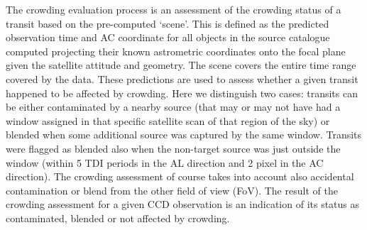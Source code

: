\documentclass{aa}
\begin{document}
The crowding evaluation process is an assessment of the crowding status of a transit based on the pre-computed `scene'. This is defined as the predicted observation time and AC coordinate for all objects in the source catalogue computed projecting their known astrometric coordinates onto the focal plane given the satellite attitude and geometry. The scene covers the entire time range covered by the data. These predictions are used to assess whether a given transit happened to be affected by crowding. Here we distinguish two cases: transits can be either contaminated by a nearby source (that may or may not have had a window assigned in that specific satellite scan of that region of the sky) or blended when some additional source was captured by the same window. Transits were flagged as blended also when the non-target source was just outside the window (within 5 TDI periods in the AL direction and 2 pixel in the AC direction). The crowding assessment of course takes into account also accidental contamination or blend from the other field of view (FoV). The result of the crowding assessment for a given CCD observation is an indication of its status as contaminated, blended or not affected by crowding.
\end{document}
